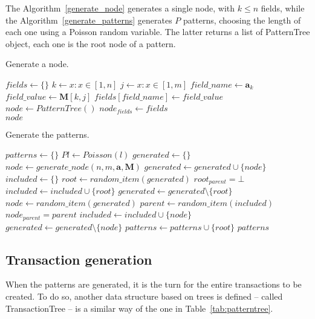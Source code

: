 \documentclass{acm_proc_article-sp-sigmod09}
\begin{document}
The Algorithm~\ref{generate_node} generates a single node, with $k \le n$ fields, while the Algorithm~\ref{generate_patterns} generates $P$ patterns, choosing the length of each one using a Poisson random variable. The latter returns a list of PatternTree object, each one is the root node of a pattern.

\begin{algorithm}
\caption{Generate a node.}
\label{generate_node}
\begin{algorithmic}[1]
\State $fields \gets \{\}$
	\State $k \gets x : x \in [1, n]$
	\State $j \gets x : x \in [1, m]$
	\State $field\_name \gets \boldsymbol{a}_k$
	\State $field\_value \gets \boldsymbol{M}[k, j]$
	\State $fields[field\_name] \gets field\_value$
\EndFor
\State $node \gets PatternTree()$
\State $node_{fields} \gets fields$ \\
\Return $node$
\EndFunction
\end{algorithmic}
\end{algorithm}

\begin{algorithm}
\caption{Generate the patterns.}
\label{generate_patterns}
\begin{algorithmic}[1]
\State $patterns \gets \{\}$
	\State $Pl \gets Poisson(l)$
	\State $generated \gets \{\}$
		\State $node \gets generate\_node(n, m, \boldsymbol{a}, \boldsymbol{M}) $ 
		\State $generated \gets generated \cup \{node\}$
	\EndFor
	\State $included \gets \{\}$
	\State $root \gets random\_item(generated)$
	\State $root_{parent} = \bot$
	\State $included \gets included \cup \{root\}$
	\State $generated \gets generated \setminus \{root\}$
		\State $node \gets random\_item(generated)$
		\State $parent \gets random\_item(included)$
		\State $node_{parent} = parent$
		\State $included \gets included \cup \{node\}$
		\State $generated \gets generated \setminus \{node\}$
	\EndFor
	\State $patterns \gets patterns \cup \{root\}$
\EndFor
\Return $patterns$
\EndFunction
\end{algorithmic}
\end{algorithm}

\subsection{Transaction generation}
When the patterns are generated, it is the turn for the entire transactions to be created. To do so, another data structure based on trees is defined -- called TransactionTree -- is a similar way of the one in Table~\ref{tab:patterntree}.
\end{document}
